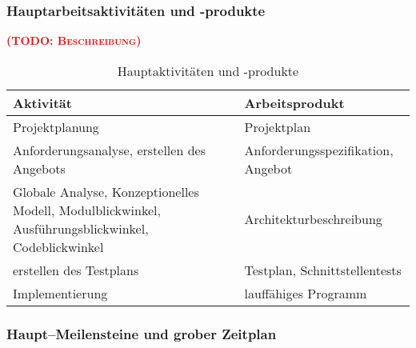 \documentclass[fontsize=12pt,paper=a4,twoside]{scrartcl}
\newcommand{\todo}[1]{\textbf{\textsc{\textcolor{red}{(TODO: #1)}}}}
\begin{document}
\subsubsection{Hauptarbeitsaktivitäten und -produkte}
\todo{Beschreibung}
\begin{table}[htbp]
\caption{Hauptaktivitäten und -produkte}
\centering
\begin{tabular}{p{7cm}|p{7cm}}
\hline Aktivität & Arbeitsprodukt \\ 
\hline Projektplanung & Projektplan\\
\hline Anforderungsanalyse, erstellen des Angebots & Anforderungsspezifikation, Angebot\\
\hline Globale Analyse, Konzeptionelles Modell, Modulblickwinkel, Ausführungsblickwinkel, Codeblickwinkel & Architekturbeschreibung\\
\hline erstellen des Testplans & Testplan, Schnittstellentests\\
\hline Implementierung & lauffähiges Programm\\
\hline 
\end{tabular}
\end{table}

\subsubsection{Haupt--Meilensteine und grober Zeitplan}
\end{document}
